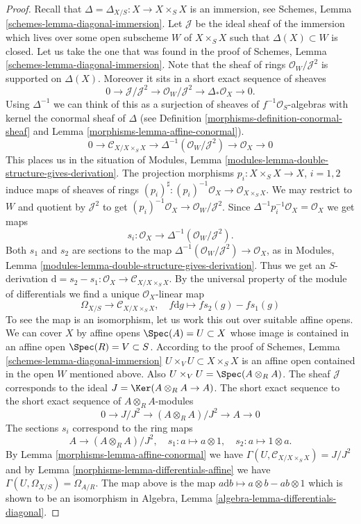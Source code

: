\begin{proof}
\medskip\noindent
Recall that $\Delta = \Delta_{X/S} : X \to X \times_S X$
is an immersion, see Schemes, Lemma \ref{schemes-lemma-diagonal-immersion}.
Let $\mathcal{J}$ be the ideal sheaf of the immersion
which lives over some open subscheme $W$ of $X \times_S X$
such that $\Delta(X) \subset W$ is closed. Let us take the one that
was found in the proof of
Schemes, Lemma \ref{schemes-lemma-diagonal-immersion}.
Note that the sheaf of rings $\mathcal{O}_W/\mathcal{J}^2$
is supported on $\Delta(X)$. Moreover it sits in a
short exact sequence of sheaves
$$
0 \to \mathcal{J}/\mathcal{J}^2
\to \mathcal{O}_W/\mathcal{J}^2
\to \Delta_*\mathcal{O}_X
\to 0.
$$
Using $\Delta^{-1}$ we can think of this as a surjection of
sheaves of $f^{-1}\mathcal{O}_S$-algebras with kernel the
conormal sheaf of $\Delta$ (see Definition \ref{morphisms-definition-conormal-sheaf}
and Lemma \ref{morphisms-lemma-affine-conormal}).
$$
0 \to \mathcal{C}_{X/X \times_S X}
\to \Delta^{-1}(\mathcal{O}_W/\mathcal{J}^2)
\to \mathcal{O}_X
\to 0
$$
This places us in the situation of
Modules, Lemma \ref{modules-lemma-double-structure-gives-derivation}.
The projection morphisms $p_i : X \times_S X \to X$, $i = 1, 2$ induce
maps of sheaves of rings
$(p_i)^\sharp : (p_i)^{-1}\mathcal{O}_X \to \mathcal{O}_{X \times_S X}$.
We may restrict to $W$ and quotient by $\mathcal{J}^2$ to get
$(p_i)^{-1}\mathcal{O}_X \to \mathcal{O}_W/\mathcal{J}^2$.
Since $\Delta^{-1}p_i^{-1}\mathcal{O}_X = \mathcal{O}_X$
we get maps
$$
s_i : \mathcal{O}_X \to \Delta^{-1}(\mathcal{O}_W/\mathcal{J}^2).
$$
Both $s_1$ and $s_2$ are sections to the map
$\Delta^{-1}(\mathcal{O}_W/\mathcal{J}^2) \to \mathcal{O}_X$,
as in Modules, Lemma \ref{modules-lemma-double-structure-gives-derivation}.
Thus we get an $S$-derivation
$\text{d} = s_2 - s_1 : \mathcal{O}_X \to \mathcal{C}_{X/X \times_S X}$.
By the universal property of the module of differentials we find a
unique $\mathcal{O}_X$-linear map
$$
\Omega_{X/S} \longrightarrow \mathcal{C}_{X/X \times_S X},\quad
f\text{d}g \longmapsto fs_2(g) - fs_1(g)
$$
To see the map is an isomorphism, let us work this out over suitable affine
opens. We can cover $X$ by affine opens $\Spec(A) = U \subset X$
whose image is contained in an affine open $\Spec(R) = V \subset S$.
According to the proof of Schemes, Lemma \ref{schemes-lemma-diagonal-immersion}
$U \times_V U \subset X \times_S X$ is an affine open
contained in the open $W$ mentioned above. Also
$U \times_V U = \Spec(A \otimes_R A)$.
The sheaf $\mathcal{J}$ corresponds to the ideal
$J = \Ker(A \otimes_R A \to A)$.
The short exact sequence to the short exact sequence
of $A \otimes_R A$-modules
$$
0 \to J/J^2 \to (A \otimes_R A)/J^2 \to A \to 0
$$
The sections $s_i$ correspond to the ring maps
$$
A \longrightarrow (A \otimes_R A)/J^2,\quad
s_1 : a \mapsto a \otimes 1,\quad
s_2 : a \mapsto 1 \otimes a.
$$
By Lemma \ref{morphisms-lemma-affine-conormal} we have
$\Gamma(U, \mathcal{C}_{X/X \times_S X}) = J/J^2$ and
by Lemma \ref{morphisms-lemma-differentials-affine}
we have $\Gamma(U, \Omega_{X/S}) = \Omega_{A/R}$.
The map above is the map $a \text{d}b \mapsto a \otimes b - ab \otimes 1$
which is shown to be an isomorphism in
Algebra, Lemma \ref{algebra-lemma-differentials-diagonal}.
\end{proof}


